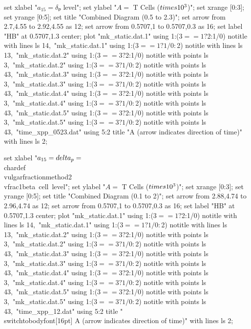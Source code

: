   set xlabel "$a_{15} = δₚ$ level";
  set ylabel "$A = $ T Cells ($\\times 10^3$)";
  set xrange [0:3];
  set yrange [0:5];
  set title "Combined Diagram (0.5 to 2.3)";
  set arrow from 2.7,4.55 to 2.92,4.55 as 12;
  set arrow from 0.5707,1 to 0.5707,0.3 as 16;
  set label "HB" at 0.5707,1.3 center;
  plot "mk_static.dat.1" using 1:($3==1?$2:1/0) notitle with lines ls 14,\
       "mk_static.dat.1" using 1:($3==1?1/0:$2) notitle with lines ls 13,\
       "mk_static.dat.2" using 1:($3==3?$2:1/0) notitle with points ls 3,\
       "mk_static.dat.2" using 1:($3==3?1/0:$2) notitle with points ls 43,\
       "mk_static.dat.3" using 1:($3==3?$2:1/0) notitle with points ls 3,\
       "mk_static.dat.3" using 1:($3==3?1/0:$2) notitle with points ls 43,\
       "mk_static.dat.4" using 1:($3==3?$2:1/0) notitle with points ls 3,\
       "mk_static.dat.4" using 1:($3==3?1/0:$2) notitle with points ls 43,\
       "mk_static.dat.5" using 1:($3==3?$2:1/0) notitle with points ls 3,\
       "mk_static.dat.5" using 1:($3==3?1/0:$2) notitle with points ls 43,\
       "time_xpp_0523.dat" using 5:2 title "A (arrow indicates direction of time)" with lines ls 2;
\stopGNUPLOTscript

\startGNUPLOTscript[bifurcation_combined_12]
  set xlabel "$a_{15} = \\delta_p = $\\chardef\\vulgarfractionmethod2\\vfrac1{beta~cell~level}";
  set ylabel "$A = $ T Cells ($\\times 10^3$)";
  set xrange [0:3];
  set yrange [0:5];
  set title "Combined Diagram (0.1 to 2)";
  set arrow from 2.88,4.74 to 2.96,4.74 as 12;
  set arrow from 0.5707,1 to 0.5707,0.3 as 16;
  set label "HB" at 0.5707,1.3 center;
  plot "mk_static.dat.1" using 1:($3==1?$2:1/0) notitle with lines ls 14,\
       "mk_static.dat.1" using 1:($3==1?1/0:$2) notitle with lines ls 13,\
       "mk_static.dat.2" using 1:($3==3?$2:1/0) notitle with points ls 3,\
       "mk_static.dat.2" using 1:($3==3?1/0:$2) notitle with points ls 43,\
       "mk_static.dat.3" using 1:($3==3?$2:1/0) notitle with points ls 3,\
       "mk_static.dat.3" using 1:($3==3?1/0:$2) notitle with points ls 43,\
       "mk_static.dat.4" using 1:($3==3?$2:1/0) notitle with points ls 3,\
       "mk_static.dat.4" using 1:($3==3?1/0:$2) notitle with points ls 43,\
       "mk_static.dat.5" using 1:($3==3?$2:1/0) notitle with points ls 3,\
       "mk_static.dat.5" using 1:($3==3?1/0:$2) notitle with points ls 43,\
       "time_xpp_12.dat" using 5:2 title "\\switchtobodyfont[16pt] A (arrow indicates direction of time)" with lines ls 2;
\stopGNUPLOTscript

